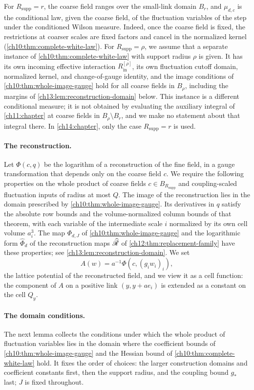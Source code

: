 For $R_{\mathrm{supp}}=r$, the coarse field ranges over the small-link domain $B_r$, and $\mu_{d,c}$ is the conditional law, given the coarse field, of the fluctuation variables of the step under the conditioned Wilson measure. Indeed, once the coarse field is fixed, the restrictions at coarser scales are fixed factors and cancel in the normalized kernel (\cref{ch10:thm:complete-white-law}). For $R_{\mathrm{supp}}=\rho$, we assume that a separate instance of \cref{ch10:thm:complete-white-law} with support radius $\rho$ is given. It has its own incoming effective interaction $R_{\mathrm{in}}^{[\rho]}$, its own fluctuation cutoff domain, normalized kernel, and change-of-gauge identity, and the image conditions of \cref{ch10:thm:whole-image-gauge} hold for all coarse fields in $B_\rho$, including the margins of \cref{ch13:lem:reconstruction-domain} below. This instance is a different conditional measure; it is not obtained by evaluating the auxiliary integral of \cref{ch11:chapter} at coarse fields in $B_\rho\setminus B_r$, and we make no statement about that integral there. In \cref{ch14:chapter}, only the case $R_{\mathrm{supp}}=r$ is used.

\paragraph{The reconstruction.}
Let $\Phi(c,q)$ be the logarithm of a reconstruction of the fine field, in a gauge transformation that depends only on the coarse field $c$. We require the following properties on the whole product of coarse fields $c\in B_{R_{\mathrm{supp}}}$ and coupling-scaled fluctuation inputs of radius at most $Q$. The image of the reconstruction lies in the domain prescribed by \cref{ch10:thm:whole-image-gauge}. Its derivatives in $q$ satisfy the absolute row bounds and the volume-normalized column bounds of that theorem, with each variable of the intermediate scale $i$ normalized by its own cell volume $a_i^3$. The map $\Phi_{d,J}$ of \cref{ch10:thm:whole-image-gauge} and the logarithmic form $\widehat\Phi_d$ of the reconstruction maps $\widehat{\mathscr R}$ of \cref{ch12:thm:replacement-family} have these properties; see \cref{ch13:lem:reconstruction-domain}. We set
\[
 A(w)=a^{-1}\Phi(c,(g_iw_i)_i),
\]
the lattice potential of the reconstructed field, and we view it as a cell function: the component of $A$ on a positive link $(y,y+ae_i)$ is extended as a constant on the cell $Q_y$.

\paragraph{The domain conditions.}
The next lemma collects the conditions under which the whole product of fluctuation variables lies in the domain where the coefficient bounds of \cref{ch10:thm:whole-image-gauge} and the Hessian bound of \cref{ch10:thm:complete-white-law} hold. It fixes the order of choices: the larger construction domains and coefficient constants first, then the support radius, and the coupling bound $g_*$ last; $J$ is fixed throughout.

